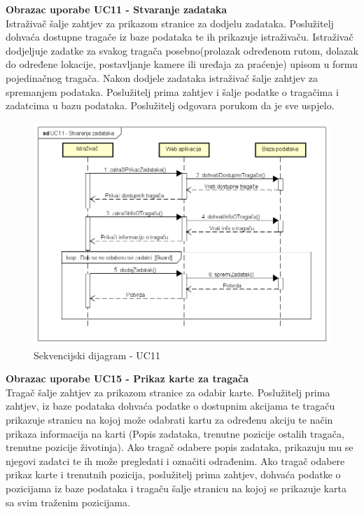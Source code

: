 				\noindent \textbf{Obrazac uporabe UC11 - Stvaranje zadataka}\\
				
				\noindent Istraživač šalje zahtjev za prikazom stranice za dodjelu zadataka. Poslužitelj dohvaća dostupne tragače iz baze podataka te ih prikazuje istraživaču. Istraživač dodjeljuje zadatke za svakog tragača posebno(prolazak određenom rutom, dolazak do određene lokacije, postavljanje kamere ili uređaja za praćenje) upisom u formu pojedinačnog tragača. Nakon dodjele zadataka istraživač šalje zahtjev za spremanjem podataka. Poslužitelj prima zahtjev i šalje podatke o tragačima i zadatcima u bazu podataka. Poslužitelj odgovara porukom da je sve uspjelo.
				
				\begin{figure}[H]
					\includegraphics[scale=0.7]{slike/UC11_sekv.PNG} %
					\centering
					\caption{Sekvencijski dijagram - UC11}
					\label{fig:promjene}
				\end{figure}
				\eject
				
				\noindent \textbf{Obrazac uporabe UC15 - Prikaz karte za tragača}\\
				
				\noindent Tragač šalje zahtjev za prikazom stranice za odabir karte. Poslužitelj prima zahtjev, iz baze podataka dohvaća podatke o dostupnim akcijama te tragaču prikazuje stranicu na kojoj može odabrati kartu za određenu akciju te način prikaza informacija na karti (Popis zadataka, trenutne pozicije ostalih tragača, trenutne pozicije životinja). Ako tragač odabere popis zadataka, prikazuju mu se njegovi zadatci te ih može pregledati i označiti odrađenim. Ako tragač odabere prikaz karte i trenutnih pozicija, poslužitelj prima zahtjev, dohvaća podatke o pozicijama iz baze podataka i tragaču šalje stranicu na kojoj se prikazuje karta sa svim traženim pozicijama.
				
